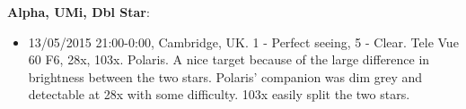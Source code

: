 {\bf Alpha, UMi, Dbl Star}:
\begin{itemize}
\item 13/05/2015 21:00-0:00, Cambridge, UK. 1 - Perfect seeing, 5 - Clear. Tele Vue 60 F6, 28x, 103x. Polaris. A nice target because of the large difference in brightness between the two stars. Polaris' companion was dim grey and detectable at 28x with some difficulty. 103x easily split the two stars. 
\end{itemize}
